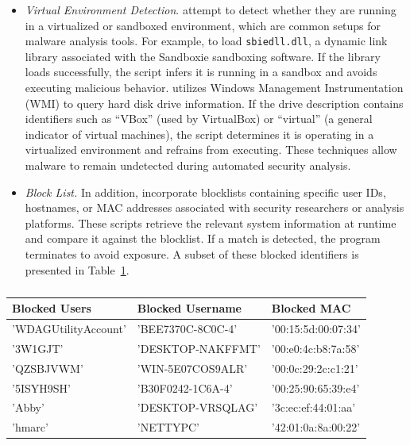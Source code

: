 \begin{itemize}
    \item \textit{Virtual Environment Detection}.  attempt to detect whether they are running in a virtualized or sandboxed environment, which are common setups for malware analysis tools. For example,  to load \texttt{sbiedll.dll}, a dynamic link library associated with the Sandboxie sandboxing software. If the library loads successfully, the script infers it is running in a sandbox and avoids executing malicious behavior.  utilizes Windows Management Instrumentation (WMI) to query hard disk drive information. If the drive description contains identifiers such as ``VBox'' (used by VirtualBox) or ``virtual'' (a general indicator of virtual machines), the script determines it is operating in a virtualized environment and refrains from executing. These techniques allow malware to remain undetected during automated security analysis.
    \item \textit{Block List.} In addition,  incorporate blocklists containing specific user IDs, hostnames, or MAC addresses associated with security researchers or analysis platforms. These scripts retrieve the relevant system information at runtime and compare it against the blocklist. If a match is detected, the program terminates to avoid exposure. A subset of these blocked identifiers is presented in Table~\ref{tbl:blocklist}.
\end{itemize}



\begin{table}[!t]
    \centering
    \caption{}\label{tbl:blocklist}
    \begin{tabular}{|l|l|l|}
    \hline
    \textbf{Blocked Users} & \textbf{Blocked Username} & \textbf{Blocked MAC} \\ \hline
    'WDAGUtilityAccount'   & 'BEE7370C-8C0C-4'         & '00:15:5d:00:07:34'  \\ \hline
    '3W1GJT'               & 'DESKTOP-NAKFFMT'         & '00:e0:4c:b8:7a:58'  \\ \hline
    'QZSBJVWM'             & 'WIN-5E07COS9ALR'         & '00:0c:29:2c:c1:21'  \\ \hline
    '5ISYH9SH'             & 'B30F0242-1C6A-4'         & '00:25:90:65:39:e4'  \\ \hline
    'Abby'                 & 'DESKTOP-VRSQLAG'         & '3c:ec:ef:44:01:aa'  \\ \hline
    'hmarc'                & 'NETTYPC'                 & '42:01:0a:8a:00:22'  \\ \hline
    \end{tabular}
\end{table}


